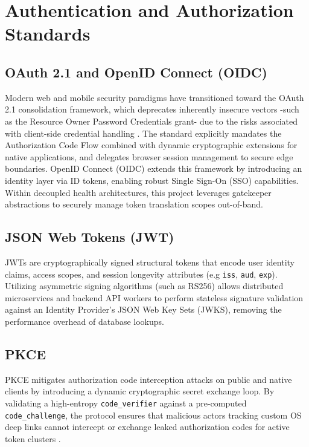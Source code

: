 \section{Authentication and Authorization Standards}

\subsection{\texorpdfstring{\ac{OAuth}}{OAuth} 2.1 and OpenID Connect (OIDC)}
Modern web and mobile security paradigms have transitioned toward the \ac{OAuth} 2.1 consolidation framework, 
which deprecates inherently insecure vectors -such as the Resource Owner Password Credentials grant- due to the risks associated with client-side credential handling \cite{rfc6749}. 
The standard explicitly mandates the Authorization Code Flow combined with dynamic cryptographic extensions for native applications, and delegates browser session management to secure edge boundaries. 
OpenID Connect (OIDC) \cite{oidc} extends this framework by introducing an identity layer via ID tokens, enabling robust Single Sign-On (SSO) capabilities. 
Within decoupled health architectures, this project leverages gatekeeper abstractions to securely manage token translation scopes out-of-band.

\subsection{JSON Web Tokens (\texorpdfstring{\ac{JWT}}{JWT})}
\ac{JWT}s \cite{rfc7519} are cryptographically signed structural tokens that encode user identity claims, access scopes, and session longevity attributes (e.g \texttt{iss}, \texttt{aud}, \texttt{exp}). 
Utilizing asymmetric signing algorithms (such as RS256) allows distributed microservices and backend API workers to perform stateless signature validation against an Identity Provider's JSON Web Key Sets (JWKS), 
removing the performance overhead of database lookups. 

\subsection{\texorpdfstring{\ac{PKCE}}{PKCE}}
\ac{PKCE} \cite{rfc7636} mitigates authorization code interception attacks on public and native clients by introducing a dynamic cryptographic secret exchange loop. 
By validating a high-entropy \texttt{code\_verifier} against a pre-computed \texttt{code\_challenge}, the protocol ensures that malicious actors tracking custom OS deep links cannot intercept or exchange leaked authorization codes for active token clusters \cite{rfc9700}.

